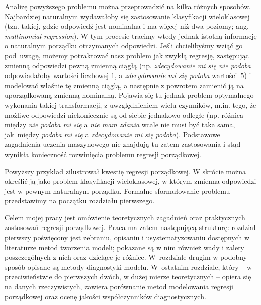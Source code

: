 \documentclass{mini}
\begin{document}
Analizę powyższego problemu można przeprowadzić na kilka różnych sposobów. Najbardziej naturalnym wydawałoby się zastosowanie klasyfikacji wieloklasowej (tzn. takiej, gdzie odpowiedź jest nominalna i ma więcej niż dwa poziomy; ang. \textit{multinomial regression}). W tym procesie tracimy wtedy jednak istotną informację o naturalnym porządku otrzymanych odpowiedzi. Jeśli chcielibyśmy wziąć go pod~uwagę, możemy potraktować nasz problem jak zwykłą regresję, zastępując zmienną odpowiedzi pewną zmienną ciągłą (np. \textit{zdecydowanie mi się nie podoba} odpowiadałoby wartości liczbowej $1$, a \textit{zdecydowanie mi się podoba} wartości~$5$) i modelować właśnie tę zmienną ciągłą, a następnie z powrotem zamienić ją na uporządkowaną zmienną nominalną. Pojawia się tu jednak problem optymalnego wykonania takiej transformacji, z uwzględnieniem wielu czynników, m.in. tego, że możliwe odpowiedzi niekoniecznie są od siebie jednakowo odległe (np. różnica między \textit{nie podoba mi się} a \textit{nie mam zdania} wcale nie musi być taka sama, jak~między \textit{podoba mi się} a \textit{zdecydowanie mi się podoba}). Podstawowe zagadnienia uczenia maszynowego nie znajdują tu zatem zastosowania i stąd wynikła konieczność rozwinięcia problemu regresji porządkowej. 

Powyższy przykład zilustrował kwestię regresji porządkowej. W skrócie można określić ją jako problem klasyfikacji wieloklasowej, w którym zmienna odpowiedzi jest w pewnym naturalnym porządku. Formalne sformułowanie problemu przedstawimy na początku rozdziału pierwszego.

Celem mojej pracy jest omówienie teoretycznych zagadnień oraz praktycznych zastosowań regresji porządkowej. Praca ma zatem następującą strukturę: rozdział pierwszy poświęcony jest zebraniu, opisaniu i usystematyzowaniu dostępnych w literaturze metod tworzenia modeli; pokazane są w nim również wady i zalety poszczególnych z nich oraz dzielące je różnice. W~rozdziale drugim w podobny sposób opisane są metody diagnostyki modelu. W~ostatnim rozdziale, który -- w przeciwieństwie do pierwszych dwóch, w dużej mierze teoretycznych -- opiera się na danych rzeczywistych, zawiera porównanie metod modelowania regresji porządkowej oraz ocenę jakości współczynników diagnostycznych.       


%
\end{document}
